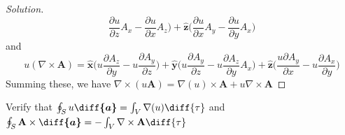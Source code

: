 \documentclass[crop=false,class=book,oneside]{standalone}
\begin{document}
\begin{proof}[Solution]
\begin{equation*}
                        \frac{\partial u}{\partial z}A_{x}
                        -\frac{\partial u}{\partial x}A_{z}
                    \big)
                    +\hat{\mathbf{z}}\big(
                        \frac{\partial u}{\partial x}A_{y}
                        -\frac{\partial u}{\partial y}A_{x}
                    \big)
                \end{equation*}
                and
                \begin{equation*}
                    u(\nabla\times\mathbf{A})
                    =\hat{\mathbf{x}}\big(
                        u\frac{\partial{A_{z}}}{\partial{y}}
                        -u\frac{\partial{A_{y}}}{\partial{z}}
                    \big)
                    +\hat{\mathbf{y}}\big(
                        u\frac{\partial{A_{y}}}{\partial{z}}
                        -u\frac{\partial{A_{z}}}{\partial{y}}A_{x}
                    \big)
                    +\hat{\mathbf{z}}\big(
                        \frac{u\partial{A_{y}}}{\partial{x}}
                        -u\frac{\partial{A_{x}}}{\partial{y}}
                    \big)
                \end{equation*}
                Summing these, we have
                $\nabla\times(u\mathbf{A})%
                 =\nabla(u)\times\mathbf{A}%
                 +u\nabla\times\mathbf{A}$
            \end{proof}
            \begin{problem}[Wangsness 1-26]
                Verify that
                $\oint_{S}u\boldsymbol{\diff{a}}%
                 =\int_{V}\nabla(u)\diff{\tau}$
                and
                $\oint_{S}\mathbf{A}\times\boldsymbol{\diff{a}}%
                 =-\int_{V}\nabla\times\mathbf{A}\diff{\tau}$
            \end{problem}
\end{document}
